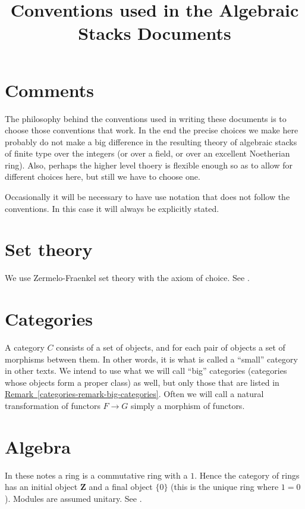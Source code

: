 \documentclass{amsart}
\theoremstyle{definition}
\theoremstyle{remark}
\numberwithin{equation}{subsection}
\begin{document}
\title{Conventions used in the Algebraic Stacks Documents}


\maketitle
\thispagestyle{fancy}

\tableofcontents

\section{Comments}
\label{section-comments}

\noindent
The philosophy behind the conventions used in writing these documents is
to choose those conventions that work. In the end the precise choices we 
make here probably do not make a big difference in the resulting theory 
of algebraic stacks of finite type over the integers (or over a field, 
or over an excellent Noetherian ring). Also, perhaps the higher level
thoery is flexible enough so as to allow for different choices here, but
still we have to choose one.

\smallskip\noindent
Occasionally it will be necessary to have use notation that does not follow 
the conventions. In this case it will always be explicitly stated.

\section{Set theory} 
\label{section-sets}

\noindent
We use Zermelo-Fraenkel set theory with the axiom of choice.
See \cite{Kunen}.

\section{Categories} 
\label{section-categories}

\noindent
A category $C$ consists of a set of objects, and for each pair of objects
a set of morphisms between them. In other words, it is what is called
a ``small'' category in other texts. We intend to use what we will
call ``big'' categories (categories whose objects form a proper class)
as well, but only those that are listed in
\hyperref[categories-remark-big-categories]%
{Remark~\ref*{categories-remark-big-categories}}. Often we will
call a natural transformation of functors $F \to G$ simply a morphism of
functors.

\section{Algebra}
\label{section-algebra}

\noindent
In these notes a ring is a commutative ring with a $1$. Hence the
category of rings has an initial object $\mathbf{Z}$ and a final
object $\{0\}$ (this is the unique ring where $1=0$). Modules are 
assumed unitary. See \cite{E}.





\end{document}
